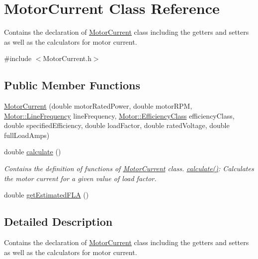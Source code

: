 \hypertarget{class_motor_current}{}\section{Motor\+Current Class Reference}
\label{class_motor_current}


Contains the declaration of \hyperlink{class_motor_current}{Motor\+Current} class including the getters and setters as well as the calculators for motor current.  




{\ttfamily \#include $<$Motor\+Current.\+h$>$}

\subsection*{Public Member Functions}
\begin{DoxyCompactItemize}
\item 
\hyperlink{class_motor_current_a099860ac4021ce07ec5b033b3bcf37e4}{Motor\+Current} (double motor\+Rated\+Power, double motor\+R\+PM, \hyperlink{class_motor_acee1bdf1b684ad36cb80dc2829d9fcee}{Motor\+::\+Line\+Frequency} line\+Frequency, \hyperlink{class_motor_afa022971ae062406a9f588c601673d4e}{Motor\+::\+Efficiency\+Class} efficiency\+Class, double specified\+Efficiency, double load\+Factor, double rated\+Voltage, double full\+Load\+Amps)
\item 
double \hyperlink{class_motor_current_a18e545d2c82f1fe247cc501eda2ce857}{calculate} ()
\begin{DoxyCompactList}\small\item\em Contains the definition of functions of \hyperlink{class_motor_current}{Motor\+Current} class. \hyperlink{class_motor_current_a18e545d2c82f1fe247cc501eda2ce857}{calculate()}\+: Calculates the motor current for a given value of load factor. \end{DoxyCompactList}\item 
double \hyperlink{class_motor_current_a0f845ec03585b21a8e476ed3e63f365f}{get\+Estimated\+F\+LA} ()
\end{DoxyCompactItemize}


\subsection{Detailed Description}
Contains the declaration of \hyperlink{class_motor_current}{Motor\+Current} class including the getters and setters as well as the calculators for motor current. 

